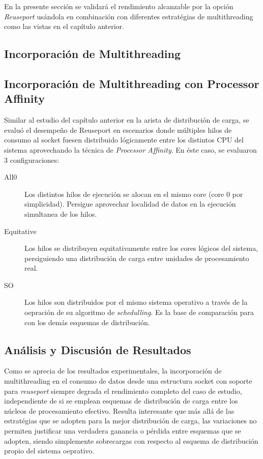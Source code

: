 En la presente sección se validará el rendimiento alcanzable por la opción \emph{Reuseport} usándola en combinación con diferentes estratégias de multithreading como las vistas en el capítulo anterior.

\subsection{Incorporación de Multithreading}

\subsection{Incorporación de Multithreading con Processor Affinity}
Similar al estudio del capítulo anterior en la arista de distribución de carga, se evaluó el desempeño de Reuseport en escenarios donde múltiples hilos de consumo al socket fuesen distribuido lógicamente entre los distintos CPU del sistema aprovechando la técnica de \emph{Processor Affinity}. En éste caso, se evaluaron 3 configuraciones:

\begin{description}
\item[All0] Los distintos hilos de ejecución se alocan en el mismo core (core 0 por simplicidad). Persigue aprovechar localidad de datos en la ejecución simultanea de los hilos.
\item[Equitative] Los hilos se distribuyen equitativamente entre los cores lógicos del sistema, persiguiendo una distribución de carga entre unidades de procesamiento real.
\item[SO] Los hilos son distribuidos por el mismo sistema operativo a través de la oepración de su algoritmo de \emph{schedulling}. Es la base de comparación para con los demás esquemas de distribución.
\end{description}

\subsection{Análisis y Discusión de Resultados}
Como se aprecia de los resultados experimentales, la incorporación de multithreading en el consumo de datos desde una estructura socket con soporte para \emph{reuseport} siempre degrada el rendimiento completo del caso de estudio, independiente de si se emplean esquemas de distribución de carga entre los núcleos de procesamiento efectivo. Resulta interesante que más allá de las estratégias que se adopten para la mejor distribución de carga, las variaciones no permiten justificar una verdadera ganancia o pérdida entre esquemas que se adopten, siendo simplemente sobrecargas con respecto al esquema de distribución propio del sistema oeprativo.

